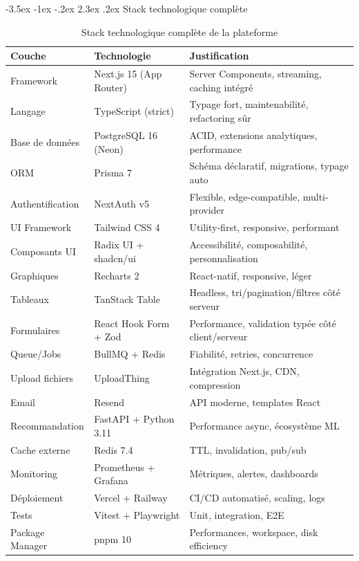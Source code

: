 \documentclass[12pt,a4paper,openany]{report}
\makeatletter
\renewcommand\section{\@startsection{section}{1}{\z@}%
  {-3.5ex \@plus -1ex \@minus -.2ex}%
  {2.3ex \@plus.2ex}%
  {\needspace{10\baselineskip}\normalfont\Large\bfseries\color{primary}}}
\makeatother
\begin{document}
\section{Stack technologique complète}

\begin{table}[H]
\centering
{}
\begin{tabularx}{\textwidth}{llX}
\toprule
\rowcolor{headerblue!20}
\textbf{Couche} & \textbf{Technologie} & \textbf{Justification} \\
\midrule
Framework & Next.js 15 (App Router) & Server Components, streaming, caching intégré \\
Langage & TypeScript (strict) & Typage fort, maintenabilité, refactoring sûr \\
Base de données & PostgreSQL 16 (Neon) & ACID, extensions analytiques, performance \\
ORM & Prisma 7 & Schéma déclaratif, migrations, typage auto \\
Authentification & NextAuth v5 & Flexible, edge-compatible, multi-provider \\
UI Framework & Tailwind CSS 4 & Utility-first, responsive, performant \\
Composants UI & Radix UI + shadcn/ui & Accessibilité, composabilité, personnalisation \\
Graphiques & Recharts 2 & React-natif, responsive, léger \\
Tableaux & TanStack Table & Headless, tri/pagination/filtres côté serveur \\
Formulaires & React Hook Form + Zod & Performance, validation typée côté client/serveur \\
Queue/Jobs & BullMQ + Redis & Fiabilité, retries, concurrence \\
Upload fichiers & UploadThing & Intégration Next.js, CDN, compression \\
Email & Resend & API moderne, templates React \\
Recommandation & FastAPI + Python 3.11 & Performance async, écosystème ML \\
Cache externe & Redis 7.4 & TTL, invalidation, pub/sub \\
Monitoring & Prometheus + Grafana & Métriques, alertes, dashboards \\
Déploiement & Vercel + Railway & CI/CD automatisé, scaling, logs \\
Tests & Vitest + Playwright & Unit, integration, E2E \\
Package Manager & pnpm 10 & Performances, workspace, disk efficiency \\
\bottomrule
\end{tabularx}
\caption{Stack technologique complète de la plateforme}
\end{table}
\end{document}
